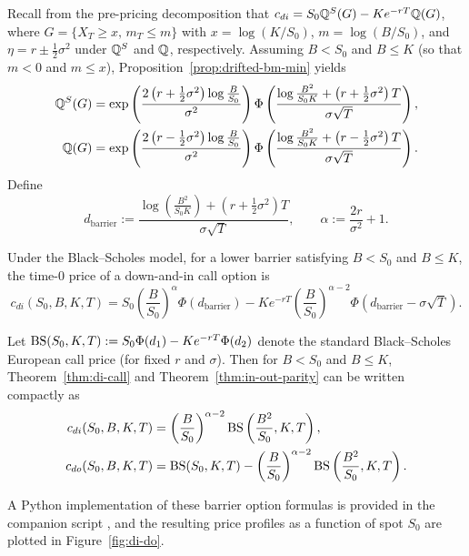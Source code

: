 Recall from the pre-pricing decomposition that $c_{di} = S_0 \mathbb{Q}^S(G) - K e^{-rT}\mathbb{Q}(G)$, where $G = \{X_T \ge x,\, m_T \le m\}$ with $x = \log(K/S_0)$, $m = \log(B/S_0)$, and $\eta = r \pm \frac{1}{2}\sigma^2$ under $\mathbb{Q}^S$ and $\mathbb{Q}$, respectively. Assuming $B < S_0$ and $B \le K$ (so that $m < 0$ and $m \le x$), Proposition~\ref{prop:drifted-bm-min} yields
\[
\begin{aligned}
    \mathbb{Q}^S(G) &= \exp\left(\frac{2\left(r + \frac{1}{2}\sigma^2\right)\log\frac{B}{S_0}}{\sigma^2}\right)\Phi\left(\frac{\log\frac{B^2}{S_0 K} + \left(r + \frac{1}{2}\sigma^2\right)T}{\sigma\sqrt{T}}\right), \\
    \mathbb{Q}(G) &= \exp\left(\frac{2\left(r - \frac{1}{2}\sigma^2\right)\log\frac{B}{S_0}}{\sigma^2}\right)\Phi\left(\frac{\log\frac{B^2}{S_0 K} + \left(r - \frac{1}{2}\sigma^2\right)T}{\sigma\sqrt{T}}\right).
\end{aligned}
\]
Define
\[
d_{\text{barrier}} := \frac{\log\left(\frac{B^2}{S_0 K}\right) + \left(r + \frac{1}{2}\sigma^2\right)T}{\sigma\sqrt{T}}, \qquad \alpha := \frac{2r}{\sigma^2} + 1.
\]

\begin{theorem}\label{thm:di-call}
    Under the Black--Scholes model, for a lower barrier satisfying $B < S_0$ and $B \le K$, the time-$0$ price of a down-and-in call option is
    \[
    c_{di}(S_0, B, K, T) = S_0\left(\frac{B}{S_0}\right)^\alpha \Phi(d_{\text{barrier}}) - K e^{-rT}\left(\frac{B}{S_0}\right)^{\alpha - 2}\Phi\left(d_{\text{barrier}} - \sigma\sqrt{T}\right).
    \]
\end{theorem}

\begin{note}
    Let $\operatorname{BS}(S_0, K, T) := S_0\Phi(d_1) - K e^{-rT}\Phi(d_2)$ denote the standard Black--Scholes European call price (for fixed $r$ and $\sigma$). Then for $B < S_0$ and $B \le K$, Theorem~\ref{thm:di-call} and Theorem~\ref{thm:in-out-parity} can be written compactly as
    \[
    \begin{aligned}
        c_{di}(S_0, B, K, T) &= \left(\frac{B}{S_0}\right)^{\alpha - 2}\operatorname{BS}\left(\frac{B^2}{S_0}, K, T\right), \\
        c_{do}(S_0, B, K, T) &= \operatorname{BS}(S_0, K, T) - \left(\frac{B}{S_0}\right)^{\alpha - 2}\operatorname{BS}\left(\frac{B^2}{S_0}, K, T\right).
    \end{aligned}
    \]
\end{note}

A Python implementation of these barrier option formulas is provided in the companion script , and the resulting price profiles as a function of spot $S_0$ are plotted in Figure~\ref{fig:di-do}.

